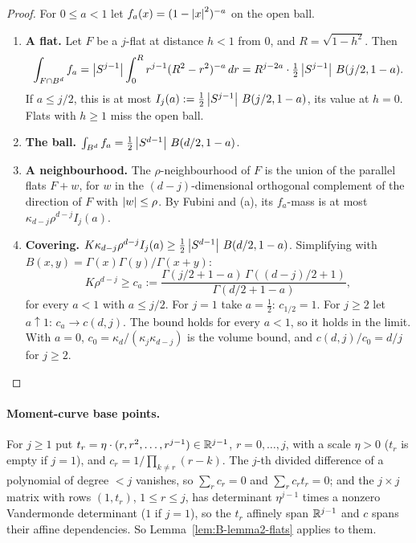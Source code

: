 \documentclass[11pt]{article}
\begin{document}
\begin{proof}
For $0\le a<1$ let $f_a(x)=(1-\left|x\right|^2)^{-a}$ on the open ball.
\begin{enumerate}[label=(\alph*)]
  \item \textbf{A flat.} Let $F$ be a $j$-flat at distance $h<1$ from $0$, and $R=\sqrt{1-h^2}$.
    Then
    \[
      \int_{F\cap B^d}f_a=\left|S^{j-1}\right|\int_0^Rr^{j-1}(R^2-r^2)^{-a}\,dr
      =R^{j-2a}\cdot\tfrac12\left|S^{j-1}\right|\,B(j/2,1-a).
    \]
    If $a\le j/2$, this is at most $I_j(a):=\frac12\left|S^{j-1}\right|\,B(j/2,1-a)$, its value at
    $h=0$. Flats with $h\ge1$ miss the open ball.
  \item \textbf{The ball.} $\int_{B^d}f_a=\frac12\left|S^{d-1}\right|\,B(d/2,1-a)$.
  \item \textbf{A neighbourhood.} The $\rho$-neighbourhood of $F$ is the union of the parallel flats
    $F+w$, for $w$ in the $(d-j)$-dimensional orthogonal complement of the direction of $F$ with
    $\left|w\right|\le\rho$. By Fubini and (a), its $f_a$-mass is at most $\kappa_{d-j}\rho^{d-j}I_j(a)$.
  \item \textbf{Covering.} $K\kappa_{d-j}\rho^{d-j}I_j(a)\ge\frac12\left|S^{d-1}\right|\,B(d/2,1-a)$.
    Simplifying with $B(x,y)=\Gamma(x)\Gamma(y)/\allowbreak\Gamma(x+y)$:
    \begin{equation*}
      K\rho^{d-j}\ge c_a:=\frac{\Gamma(j/2+1-a)\,\Gamma((d-j)/2+1)}{\Gamma(d/2+1-a)},
    \end{equation*}
    for every $a<1$ with $a\le j/2$.
    For $j=1$ take $a=\frac12$: $c_{1/2}=1$. For $j\ge2$ let $a\uparrow1$: $c_a\to c(d,j)$. The bound
    holds for every $a<1$, so it holds in the limit. With $a=0$,
    $c_0=\kappa_d/(\kappa_j\kappa_{d-j})$ is the volume bound, and $c(d,j)/c_0=d/j$ for
    $j\ge2$.\qedhere
\end{enumerate}
\end{proof}

\paragraph{Moment-curve base points.} For $j\ge1$ put $t_r=\eta\cdot(r,r^2,\dots,r^{j-1})\in\mathbb{R}^{j-1}$, $r=0,\dots,j$, with a
scale $\eta>0$ ($t_r$ is empty if $j=1$), and $c_r=1/\prod_{k\ne r}(r-k)$. The $j$-th divided difference of a polynomial
of degree $<j$ vanishes, so $\sum_rc_r=0$ and $\sum_rc_rt_r=0$; and the $j\times j$ matrix with rows $(1,t_r)$, $1\le r\le j$, has determinant $\eta^{j-1}$ times a nonzero
Vandermonde determinant ($1$ if $j=1$), so the $t_r$ affinely span $\mathbb{R}^{j-1}$ and $c$ spans their affine dependencies. So
Lemma~\ref{lem:B-lemma2-flats} applies to them.
\end{document}
